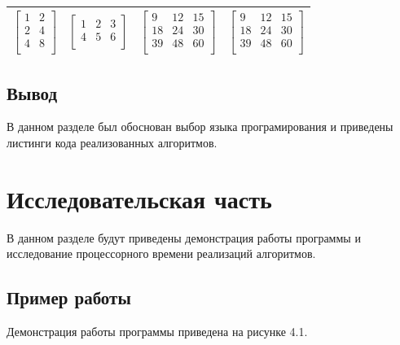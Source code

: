 \documentclass[12pt]{report}
\begin{document}
\begin{table}[h]
\begin{center}
\begin{tabular}{ | c | c | c | c |}
			$\begin{bmatrix} 
				1&2 \\
				2&4 \\ 
				4&8 \\ 
			\end{bmatrix}$ & 
			$\begin{bmatrix} 
				1&2&3 \\
				4&5&6 \\ 
			\end{bmatrix}$ &
			$\begin{bmatrix} 
				9&12&15 \\
				18&24&30 \\ 
				39&48&60 \\ 
			\end{bmatrix}$ &
			$\begin{bmatrix} 
				9&12&15 \\
				18&24&30 \\ 
				39&48&60 \\
			\end{bmatrix}$\\
			\hline
		\end{tabular}
		
	\end{center}
\end{table} 

\section{Вывод}
В данном разделе  был обоснован выбор языка програмирования и приведены листинги кода реализованных алгоритмов.

\chapter{Исследовательская часть}

В данном разделе будут приведены демонстрация работы программы и исследование процессорного времени реализаций алгоритмов.

\section{Пример работы}

Демонстрация работы программы приведена на рисунке 4.1.
\end{document}
